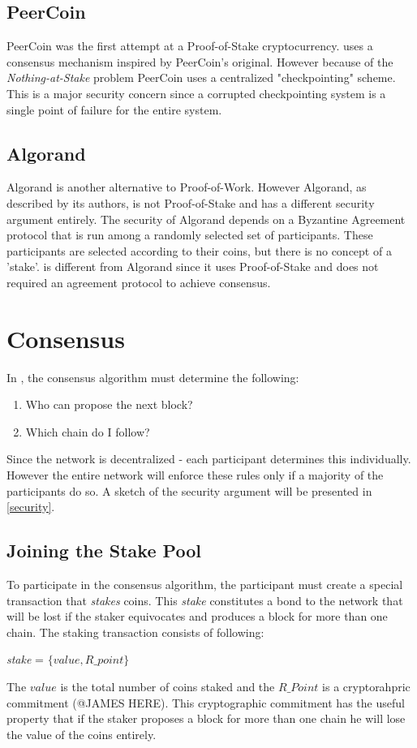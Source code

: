\documentclass{article}
\begin{document}
\subsection{PeerCoin}
PeerCoin \cite{peercoin} was the first attempt at a Proof-of-Stake cryptocurrency. \coin uses a consensus mechanism inspired by PeerCoin's original. However because of the \textit{Nothing-at-Stake} problem PeerCoin uses a centralized "checkpointing" scheme. This is a major security concern since a corrupted checkpointing system is a single point of failure for the entire system.  

\subsection{Algorand}
Algorand \cite{algorand} is another alternative to Proof-of-Work. However Algorand, as described by its authors, is not Proof-of-Stake and has a different security argument entirely. The security of Algorand depends on a Byzantine Agreement protocol that is run among a randomly selected set of participants. These participants are selected according to their coins, but there is no concept of a 'stake'. \coin is different from Algorand since it uses Proof-of-Stake and does not required an agreement protocol to achieve consensus.  

\section{\coin Consensus}
In \coin, the consensus algorithm must determine the following:
\begin{enumerate}
\item{Who can propose the next block?}
\item{Which chain do I follow?}
\end{enumerate}
Since the network is decentralized - each participant determines this individually. However the entire network will enforce these rules only if a majority of the participants do so. A sketch of the security argument will be presented in \ref{security}.

\subsection{Joining the Stake Pool}
To participate in the consensus algorithm, the participant must create a special transaction that \textit{stakes} coins. This \textit{stake} constitutes a bond to the network that will be lost if the staker equivocates and produces a block for more than one chain. The staking transaction consists of following:
\begin{center}
\textit{stake} = $\{value, R\_point\}$
\end{center}
The $value$ is the total number of coins staked and the $R\_Point$ is a cryptorahpric commitment (@JAMES HERE). This cryptographic commitment has the useful property that if the staker proposes a block for more than one chain he will lose the value of the coins entirely.  
\end{document}
